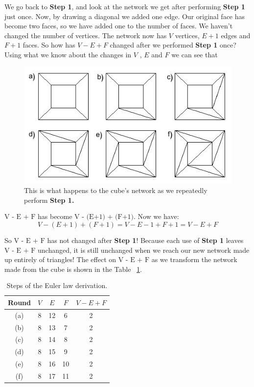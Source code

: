 We go back to \textbf{Step 1}, and look at the network we get after performing
\textbf{Step 1} just once. Now, by drawing a diagonal we added one edge. Our original
face has become two faces, so we have added one to the number of faces. We
haven’t changed the number of vertices. The network now has $V$ vertices, $E + 1$
edges and $F + 1$ faces. So how has $V - E + F$ changed after we performed \textbf{Step 1} once? Using what we know about the changes in $V$ , $E$ and $F$ we can see that


\begin{figure}[h]
\centering
\includegraphics[width=1 \textwidth]{images/cube_triangular_faces}
\caption{This is what happens to the cube’s network as we repeatedly perform \textbf{Step 1.
}}
\end{figure}

\noindent {}${\text{V - E + F}}$ has become ${\text{V - (E+1) + (F+1)}}$. Now we have: \\
\begin{equation}
V - (E+1) + (F+1)= V - E - 1 + F + 1 = V - E + F
\end{equation}


\noindent So ${\text{V - E + F}}$ has not changed after \textbf{Step 1}! Because each use of \textbf{Step 1} leaves
${\text{V - E + F}}$ unchanged, it is still unchanged when we reach our new network
made up entirely of triangles! The effect on ${\text{V - E + F}}$ as we transform the
network made from the cube is shown in the Table ~\ref{tab:Euler law}.

\begin{table}[h!]
	\begin{center}
		\caption{Steps of the Euler law derivation.}
		\label{tab:Euler law}
		\begin{tabular}{| c | c | c | c | c |}
			\hline
			Round & $V$ & $E$ & $F$ & $V-E+F$ \\ \hline
			(a) & 8 & 12 & 6 & 2 \\ \hline
			(b) & 8 & 13 & 7 & 2 \\ \hline
			(c) & 8 & 14 & 8 & 2 \\ \hline
			(d) & 8 & 15 & 9 & 2 \\ \hline
			(e) & 8 & 16 & 10 & 2 \\ \hline
			(f) & 8 & 17 & 11 & 2 \\ \hline
		\end{tabular}
	\end{center}


\end{table}


